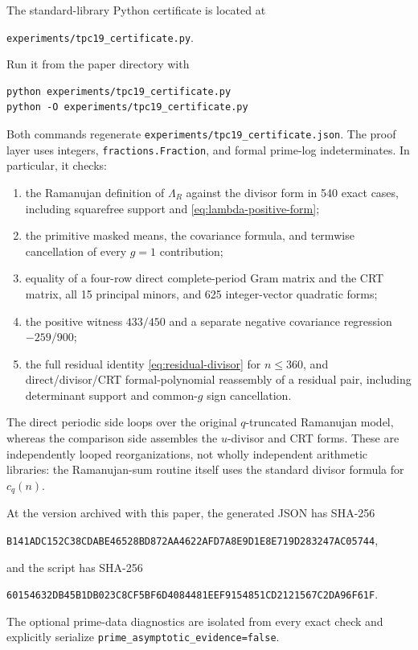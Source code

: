 The standard-library Python certificate is located at
\begin{center}
\texttt{experiments/tpc19\_certificate.py}.
\end{center}
Run it from the paper directory with
\begin{verbatim}
python experiments/tpc19_certificate.py
python -O experiments/tpc19_certificate.py
\end{verbatim}
Both commands regenerate
\texttt{experiments/tpc19\_certificate.json}.  The proof layer uses
integers, \texttt{fractions.Fraction}, and formal prime-log
indeterminates.  In particular, it checks:
\begin{enumerate}[label=\textnormal{(\roman*)}]
 \item the Ramanujan definition of \(\Lambda_R\) against the divisor
 form in 540 exact cases, including squarefree support and
 \eqref{eq:lambda-positive-form};
 \item the primitive masked means, the covariance formula, and
 termwise cancellation of every \(g=1\) contribution;
 \item equality of a four-row direct complete-period Gram matrix and
 the CRT matrix, all 15 principal minors, and 625 integer-vector
 quadratic forms;
 \item the positive witness \(433/450\) and a separate negative
 covariance regression \(-259/900\);
 \item the full residual identity \eqref{eq:residual-divisor} for
 \(n\le360\), and direct/divisor/CRT formal-polynomial reassembly of a
 residual pair, including determinant support and common-\(g\) sign
 cancellation.
\end{enumerate}
The direct periodic side loops over the original \(q\)-truncated
Ramanujan model, whereas the comparison side assembles the
\(u\)-divisor and CRT forms.  These are independently looped
reorganizations, not wholly independent arithmetic libraries: the
Ramanujan-sum routine itself uses the standard divisor formula for
\(c_q(n)\).

At the version archived with this paper, the generated JSON has
SHA-256
\begin{center}
\texttt{B141ADC152C38CDABE46528BD872AA4622AFD7A8E9D1E8E719D283247AC05744},
\end{center}
and the script has SHA-256
\begin{center}
\texttt{60154632DB45B1DB023C8CF5BF6D4084481EEF9154851CD2121567C2DA96F61F}.
\end{center}
The optional prime-data diagnostics are isolated from every exact
check and explicitly serialize
\texttt{prime\_asymptotic\_evidence=false}.

